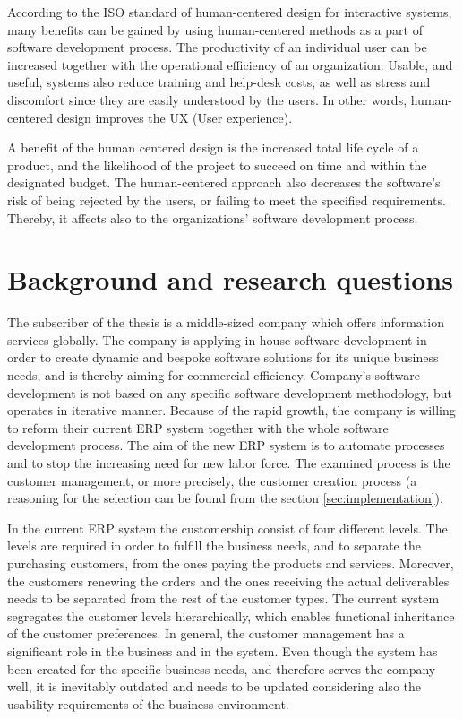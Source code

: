 \documentclass[12pt,a4paper,oneside,pdftex]{report}
\begin{document}
\indent According to the ISO standard of human-centered design for interactive systems, many benefits can be gained by using human-centered methods as a part of software development process. The productivity of an individual user can be increased together with the operational efficiency of an organization. Usable, and useful, systems also reduce training and help-desk costs, as well as stress and discomfort since they are easily understood by the users. In other words, human-centered design improves the UX (User experience). \citep{RefWorks:40}

A benefit of the human centered design is the increased total life cycle of a product, and the likelihood of the project to succeed on time and within the designated budget. The human-centered approach also decreases the software's risk of being rejected by the users, or failing to meet the specified requirements. \citep{RefWorks:40} Thereby, it affects also to the organizations' software development process.

\section{Background and research questions}
\label{sec:background}
The subscriber of the thesis is a middle-sized company which offers information services globally. The company is applying in-house software development in order to create dynamic and bespoke software solutions for its unique business needs, and is thereby aiming for commercial efficiency. Company's software development is not based on any specific software development methodology, but operates in iterative manner. Because of the rapid growth, the company is willing to reform their current ERP system together with the whole software development process. The aim of the new ERP system is to automate processes and to stop the increasing need for new labor force. The examined process is the customer management, or more precisely, the customer creation process  (a reasoning for the selection can be found from the section \ref{sec:implementation}). 

In the current ERP system the customership consist of four different levels. The levels are required in order to fulfill the business needs, and to separate the purchasing customers, from the ones paying the products and services. Moreover, the customers renewing the orders and the ones receiving the actual deliverables needs to be separated from the rest of the customer types. The current system segregates the customer levels hierarchically, which enables functional inheritance of the customer preferences. In general, the customer management has a significant role in the business and in the system. Even though the system has been created for the specific business needs, and therefore serves the company well, it is inevitably outdated and needs to be updated considering also the usability requirements of the business environment.
\end{document}
